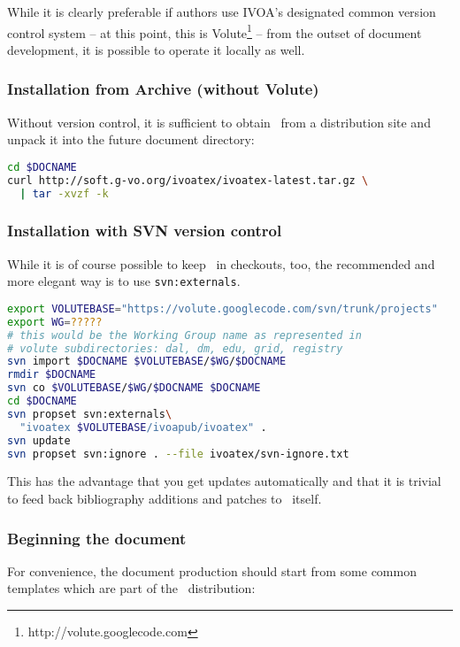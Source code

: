 \documentclass[11pt,a4paper]{ivoa}
\begin{document}
While it is clearly preferable if authors use IVOA's 
designated common version control
system -- at this point, this is
Volute\footnote{http://volute.googlecode.com} -- from the outset of
document development, it is possible to operate it locally as well.

\subsubsection{Installation from Archive (without Volute)}

Without version control, it is sufficient to obtain \ivoatex\ from a
distribution site and unpack it into the future document directory:

\begin{lstlisting}[language=sh]
cd $DOCNAME
curl http://soft.g-vo.org/ivoatex/ivoatex-latest.tar.gz \
  | tar -xvzf -k
\end{lstlisting}

\subsubsection{Installation with SVN version control}

While it is of course possible to keep \ivoatex\ in checkouts, too,
the recommended and more elegant way is to use \texttt{svn:externals}.

\begin{lstlisting}[language=sh]
export VOLUTEBASE="https://volute.googlecode.com/svn/trunk/projects"
export WG=?????
# this would be the Working Group name as represented in
# volute subdirectories: dal, dm, edu, grid, registry
svn import $DOCNAME $VOLUTEBASE/$WG/$DOCNAME
rmdir $DOCNAME
svn co $VOLUTEBASE/$WG/$DOCNAME $DOCNAME
cd $DOCNAME
svn propset svn:externals\
  "ivoatex $VOLUTEBASE/ivoapub/ivoatex" .
svn update
svn propset svn:ignore . --file ivoatex/svn-ignore.txt
\end{lstlisting}

This has the advantage that you get updates automatically and that it is 
trivial to feed back bibliography additions and patches to \ivoatex\
itself.

\subsubsection{Beginning the document}
\label{sect:beginning}

For convenience, the document production should start from some common
templates which are part of the \ivoatex\ distribution:
\end{document}
